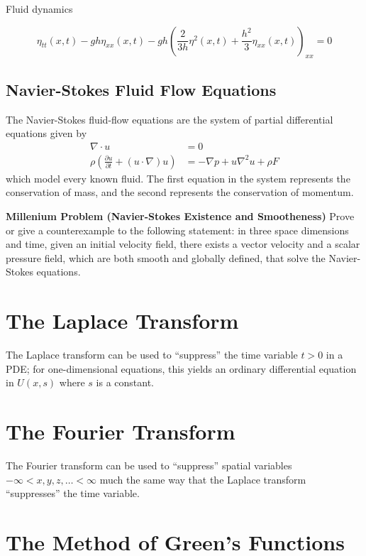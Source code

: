 \documentclass[12pt]{article}
\begin{document}
Fluid dynamics

$$ \eta_{tt}(x, t) - gh\eta_{xx}(x,t) - gh\left( \frac{2}{3h}\eta^2(x,t) + \frac{h^2}{3}\eta_{xx}(x,t) \right)_{xx} = 0  $$

\subsection{Navier-Stokes Fluid Flow Equations}

The Navier-Stokes fluid-flow equations are the system of partial differential equations given by $$\begin{aligned}
    \nabla \cdot u &= 0\\
    \rho \left(\frac{\partial u}{\partial t} + (u \cdot \nabla)u \right) &= -\nabla p + u\nabla^2 u + \rho F
\end{aligned}$$ which model every known fluid. The first equation in the system represents the conservation of mass, and the second represents the conservation of momentum.


\textbf{Millenium Problem (Navier-Stokes Existence and Smootheness)} Prove or give a counterexample to the following statement: in three space dimensions and time, given an initial velocity field, there exists a vector velocity and a scalar pressure field, which are both smooth and globally defined, that solve the Navier-Stokes equations.




\section{The Laplace Transform}

The Laplace transform can be used to ``suppress'' the time variable $t > 0$ in a PDE; for one-dimensional equations, this yields an ordinary differential equation in $U(x,s)$ where $s$ is a constant.

\section{The Fourier Transform}

The Fourier transform can be used to ``suppress'' spatial variables $-\infty < x, y, z, \dots < \infty$ much the same way that the Laplace transform ``suppresses'' the time variable.

\section{The Method of Green's Functions}
\end{document}

